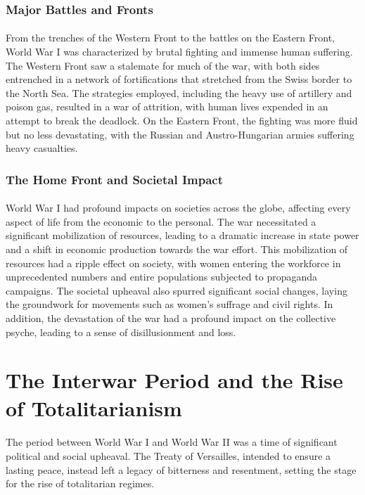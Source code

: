 \documentclass[a4paper,12pt]{book}
\begin{document}
\subsubsection*{Major Battles and Fronts}
\paragraph{}
From the trenches of the Western Front to the battles on the Eastern Front, World War I was characterized by brutal fighting and immense human suffering. The Western Front saw a stalemate for much of the war, with both sides entrenched in a network of fortifications that stretched from the Swiss border to the North Sea. The strategies employed, including the heavy use of artillery and poison gas, resulted in a war of attrition, with human lives expended in an attempt to break the deadlock. On the Eastern Front, the fighting was more fluid but no less devastating, with the Russian and Austro-Hungarian armies suffering heavy casualties. 

\subsubsection*{The Home Front and Societal Impact}
\paragraph{}
World War I had profound impacts on societies across the globe, affecting every aspect of life from the economic to the personal. The war necessitated a significant mobilization of resources, leading to a dramatic increase in state power and a shift in economic production towards the war effort. This mobilization of resources had a ripple effect on society, with women entering the workforce in unprecedented numbers and entire populations subjected to propaganda campaigns. The societal upheaval also spurred significant social changes, laying the groundwork for movements such as women’s suffrage and civil rights. In addition, the devastation of the war had a profound impact on the collective psyche, leading to a sense of disillusionment and loss. 

\section*{The Interwar Period and the Rise of Totalitarianism}
\paragraph{}
The period between World War I and World War II was a time of significant political and social upheaval. The Treaty of Versailles, intended to ensure a lasting peace, instead left a legacy of bitterness and resentment, setting the stage for the rise of totalitarian regimes.
\end{document}
